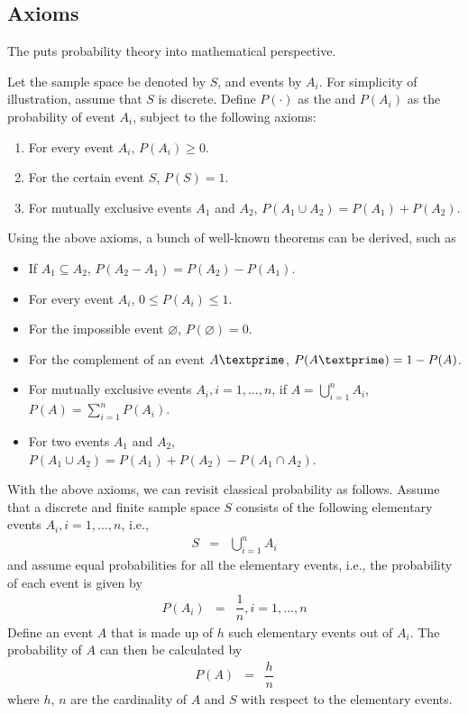 \subsection{Axioms} \label{subsec:probability_axioms}

The  puts probability theory into mathematical perspective. 

Let the sample space be denoted by $S$, and events by $A_i$. For simplicity of illustration, assume that $S$ is discrete. Define $P(\cdot)$ as the  and $P(A_i)$ as the probability of event $A_i$, subject to the following axioms:
\begin{enumerate}
  \item For every event $A_i$, $P(A_i)\geq 0$.
  \item For the certain event $S$, $P(S)=1$.
  \item For mutually exclusive events $A_1$ and $A_2$, $P\left(A_1\cup A_2\right) = P(A_1)+P(A_2)$.
\end{enumerate}

Using the above axioms, a bunch of well-known theorems can be derived, such as
\begin{itemize}
  \item If $A_1 \subseteq A_2$, $P(A_2-A_1) = P(A_2)-P(A_1)$.
  \item For every event $A_i$, $0\leq P(A_i) \leq 1$.
  \item For the impossible event $\varnothing$, $P(\varnothing)=0$.
  \item For the complement of an event $A\textprime$, $P(A\textprime)=1-P(A)$.
  \item For mutually exclusive events $A_i, i=1,...,n$, if $A = \bigcup_{i=1}^{n} A_i$, $P(A) = \sum_{i=1}^{n}P(A_i)$.
  \item For two events $A_1$ and $A_2$, $P\left(A_1\cup A_2\right) = P(A_1)+P(A_2)-P\left(A_1\cap A_2\right)$.
\end{itemize}

With the above axioms, we can revisit classical probability as follows. Assume that a discrete and finite sample space $S$ consists of the following elementary events $A_i, i=1,...,n$, i.e.,
\begin{eqnarray}
  S &=& \bigcup_{i=1}^{n} A_i \nonumber
\end{eqnarray}
and assume equal probabilities for all the elementary events, i.e., the probability of each event is given by
\begin{eqnarray}
  P(A_i) &=& \dfrac{1}{n}, i=1,...,n \nonumber
\end{eqnarray}
Define an event $A$ that is made up of $h$ such elementary events out of $A_i$. The probability of $A$ can then be calculated by
\begin{eqnarray}
  P(A) &=& \dfrac{h}{n} \nonumber
\end{eqnarray}
where $h$, $n$ are the cardinality of $A$ and $S$ with respect to the elementary events.


